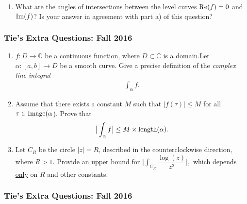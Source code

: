 \begin{enumerate}
\def\labelenumi{(\roman{enumi})}
\setcounter{enumi}{1}
\tightlist
\item
  What are the angles of intersections between the level curves
  \(\mbox{\textrm Re}{(f)}=0\) and \(\mbox{\textrm Im}{(f)}\)? Is your
  answer in agreement with part a) of this question?
\end{enumerate}

\hypertarget{ties-extra-questions-fall-2016-2}{%
\subsubsection{Tie's Extra Questions: Fall
2016}\label{ties-extra-questions-fall-2016-2}}

\begin{enumerate}
\def\labelenumi{(\alph{enumi})}
\item
  \(f: D\rightarrow {\mathbb C}\) be a continuous function, where
  \(D\subset {\mathbb C}\) is a domain.Let \(\alpha:[a,b]\rightarrow D\)
  be a smooth curve. Give a precise definition of the \emph{complex line
  integral}
  \begin{align*}\int_{\alpha} f.\end{align*}
\item
  Assume that there exists a constant \(M\) such that
  \(|f(\tau)|\leq M\) for all \(\tau\in \mbox{\textrm Image}(\alpha\)).
  Prove that
  \begin{align*}\big | \int_{\alpha} f \big |\leq M \times \mbox{\textrm length}(\alpha).\end{align*}
\item
  Let \(C_R\) be the circle \(|z|=R\), described in the counterclockwise
  direction, where \(R>1\). Provide an upper bound for
  \(\big | \int_{C_R} \dfrac{\log{(z)} }{z^2} \big |,\) which depends
  \underline{only} on \(R\) and other constants.
\end{enumerate}

\hypertarget{ties-extra-questions-fall-2016-3}{%
\subsubsection{Tie's Extra Questions: Fall
2016}\label{ties-extra-questions-fall-2016-3}}

